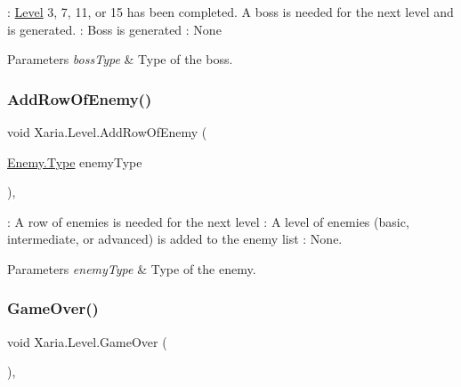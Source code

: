 \+: \hyperlink{classXaria_1_1Level}{Level} 3, 7, 11, or 15 has been completed. A boss is needed for the next level and is generated. \+: Boss is generated \+: None 


\begin{DoxyParams}{Parameters}
{\em boss\+Type} & Type of the boss.\\
\hline
\end{DoxyParams}
\mbox{\label{classXaria_1_1Level_a90464cee28b51fe396f2990c15af90f3}} 
\subsubsection{\texorpdfstring{Add\+Row\+Of\+Enemy()}{AddRowOfEnemy()}}
{\footnotesize\ttfamily void Xaria.\+Level.\+Add\+Row\+Of\+Enemy (\begin{DoxyParamCaption}\item[{\hyperlink{classXaria_1_1Enemy_af736652ccf0a3aabacb41bd1afd41234}{Enemy.\+Type}}]{enemy\+Type }\end{DoxyParamCaption})\hspace{0.3cm}{\ttfamily [inline]}, {\ttfamily [private]}}



\+: A row of enemies is needed for the next level \+: A level of enemies (basic, intermediate, or advanced) is added to the enemy list \+: None. 


\begin{DoxyParams}{Parameters}
{\em enemy\+Type} & Type of the enemy.\\
\hline
\end{DoxyParams}
\mbox{\label{classXaria_1_1Level_aca4ebca18f725704744d9c51073a44a5}} 
\subsubsection{\texorpdfstring{Game\+Over()}{GameOver()}}
{\footnotesize\ttfamily void Xaria.\+Level.\+Game\+Over (\begin{DoxyParamCaption}{ }\end{DoxyParamCaption})\hspace{0.3cm}{\ttfamily [inline]}, {\ttfamily [private]}}




